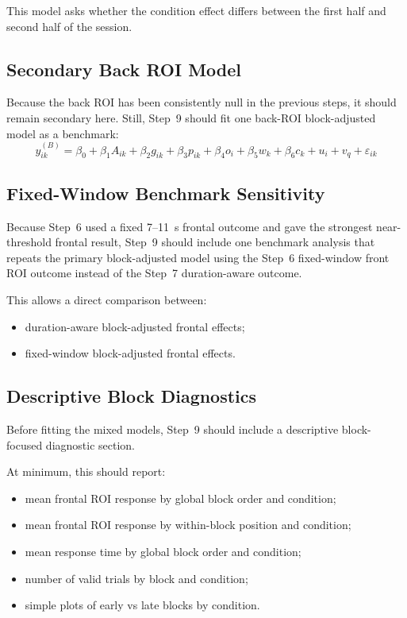 This model asks whether the condition effect differs between the first half and second half
of the session.

\subsection{Secondary Back ROI Model}
Because the back ROI has been consistently null in the previous steps, it should remain secondary here.
Still, Step~9 should fit one back-ROI block-adjusted model as a benchmark:
\begin{equation}
y^{(B)}_{ik}
=
\beta_0
+
\beta_1 A_{ik}
+
\beta_2 g_{ik}
+
\beta_3 p_{ik}
+
\beta_4 o_i
+
\beta_5 w_k
+
\beta_6 c_k
+
u_i
+
v_q
+
\varepsilon_{ik}
\end{equation}

\subsection{Fixed-Window Benchmark Sensitivity}
Because Step~6 used a fixed 7--11~s frontal outcome and gave the strongest near-threshold frontal result,
Step~9 should include one benchmark analysis that repeats the primary block-adjusted model
using the Step~6 fixed-window front ROI outcome instead of the Step~7 duration-aware outcome.

This allows a direct comparison between:
\begin{itemize}
    \item duration-aware block-adjusted frontal effects;
    \item fixed-window block-adjusted frontal effects.
\end{itemize}

\subsection{Descriptive Block Diagnostics}
Before fitting the mixed models, Step~9 should include a descriptive block-focused diagnostic section.

At minimum, this should report:
\begin{itemize}
    \item mean frontal ROI response by global block order and condition;
    \item mean frontal ROI response by within-block position and condition;
    \item mean response time by global block order and condition;
    \item number of valid trials by block and condition;
    \item simple plots of early vs late blocks by condition.
\end{itemize}

